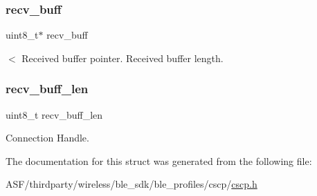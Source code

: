 \mbox{\label{structcsc__report__ntf_a62db31036412e0d65022850a7f750993}} 
\subsubsection{\texorpdfstring{recv\_buff}{recv\_buff}}
{\footnotesize\ttfamily uint8\+\_\+t$\ast$ recv\+\_\+buff}

$<$ Received buffer pointer. Received buffer length. \mbox{\label{structcsc__report__ntf_a60702265a30bbab4ed02114bb3f074ed}} 
\subsubsection{\texorpdfstring{recv\_buff\_len}{recv\_buff\_len}}
{\footnotesize\ttfamily uint8\+\_\+t recv\+\_\+buff\+\_\+len}

Connection Handle. 

The documentation for this struct was generated from the following file\+:\begin{DoxyCompactItemize}
\item 
A\+S\+F/thirdparty/wireless/ble\+\_\+sdk/ble\+\_\+profiles/cscp/\mbox{\hyperlink{cscp_8h}{cscp.\+h}}\end{DoxyCompactItemize}
